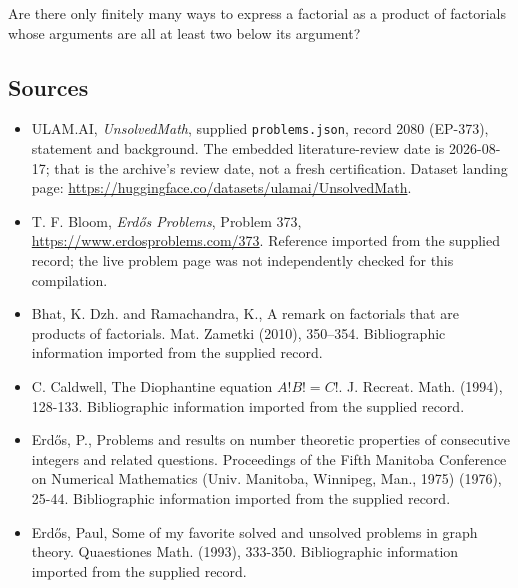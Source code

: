 \documentclass[11pt,a4paper]{article}
\begin{document}
Are there only finitely many ways to express a factorial as a product of factorials whose arguments are all at least two below its argument?

\subsection{Sources}

{\small

\begin{itemize}

\item[\hypertarget{source:2080:1}{S1}] ULAM.AI, \emph{UnsolvedMath}, supplied \texttt{problems.json}, record 2080 (EP-373), statement and background. The embedded literature-review date is 2026-08-17; that is the archive’s review date, not a fresh certification. Dataset landing page: \url{https://huggingface.co/datasets/ulamai/UnsolvedMath}.

\item[\hypertarget{source:2080:2}{S2}] T. F. Bloom, \emph{Erdős Problems}, Problem 373, \url{https://www.erdosproblems.com/373}. Reference imported from the supplied record; the live problem page was not independently checked for this compilation.

\item[\hypertarget{source:2080:3}{S3}] Bhat, K. Dzh. and Ramachandra, K., A remark on factorials that are products of factorials. Mat. Zametki (2010), 350--354. Bibliographic information imported from the supplied record.

\item[\hypertarget{source:2080:4}{S4}] C. Caldwell, The Diophantine equation $A!B!=C!$. J. Recreat. Math. (1994), 128-133. Bibliographic information imported from the supplied record.

\item[\hypertarget{source:2080:5}{S5}] Erd\H{o}s, P., Problems and results on number theoretic properties of consecutive integers and related questions. Proceedings of the Fifth Manitoba Conference on Numerical Mathematics (Univ. Manitoba, Winnipeg, Man., 1975) (1976), 25-44. Bibliographic information imported from the supplied record.

\item[\hypertarget{source:2080:6}{S6}] Erd\H{o}s, Paul, Some of my favorite solved and unsolved problems in graph theory. Quaestiones Math. (1993), 333-350. Bibliographic information imported from the supplied record.

\end{itemize}

}

\label{end:2080}
\end{document}
